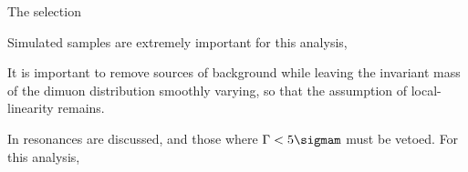 The selection







Simulated samples are extremely important for this analysis,




It is important to remove sources of background while leaving the invariant mass of the dimuon
distribution smoothly varying, so that the assumption of local-linearity remains.

In  resonances are discussed, and those where $\Gamma<5\sigmam$ must be vetoed.
For this analysis,





%
%
%
%

